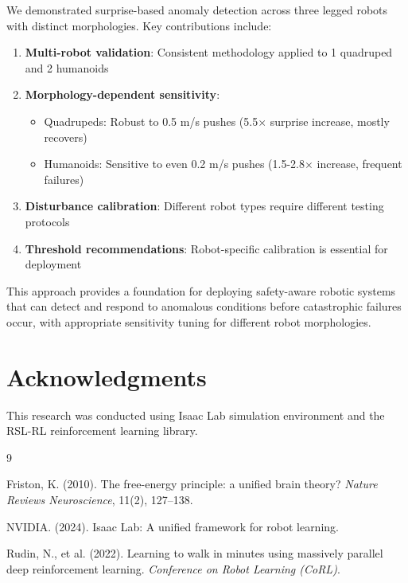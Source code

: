 \documentclass[11pt,a4paper]{article}
\begin{document}
We demonstrated surprise-based anomaly detection across three legged robots with distinct morphologies. Key contributions include:

\begin{enumerate}
    \item \textbf{Multi-robot validation}: Consistent methodology applied to 1 quadruped and 2 humanoids
    
    \item \textbf{Morphology-dependent sensitivity}: 
    \begin{itemize}
        \item Quadrupeds: Robust to 0.5 m/s pushes (5.5$\times$ surprise increase, mostly recovers)
        \item Humanoids: Sensitive to even 0.2 m/s pushes (1.5-2.8$\times$ increase, frequent failures)
    \end{itemize}
    
    \item \textbf{Disturbance calibration}: Different robot types require different testing protocols
    
    \item \textbf{Threshold recommendations}: Robot-specific calibration is essential for deployment
\end{enumerate}

This approach provides a foundation for deploying safety-aware robotic systems that can detect and respond to anomalous conditions before catastrophic failures occur, with appropriate sensitivity tuning for different robot morphologies.

\section*{Acknowledgments}

This research was conducted using Isaac Lab simulation environment and the RSL-RL reinforcement learning library.

\begin{thebibliography}{9}

Friston, K. (2010). The free-energy principle: a unified brain theory? \textit{Nature Reviews Neuroscience}, 11(2), 127--138.

NVIDIA. (2024). Isaac Lab: A unified framework for robot learning.

Rudin, N., et al. (2022). Learning to walk in minutes using massively parallel deep reinforcement learning. \textit{Conference on Robot Learning (CoRL)}.

\end{thebibliography}
\end{document}
